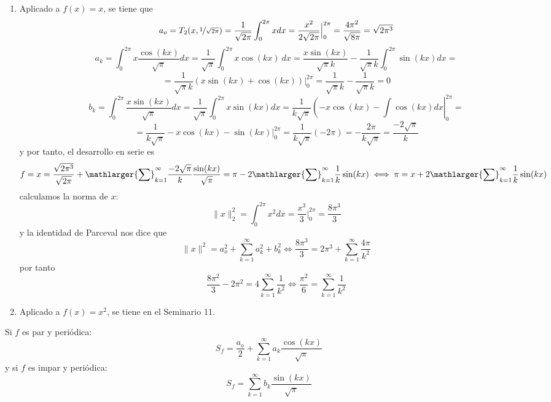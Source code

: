     \begin{eje} \: 
        \begin{enumerate} 
            \item Aplicado a $f(x)=x$, se tiene que
            $$a_o=T_2(x,\nicefrac{1}{\sqrt{2\pi}})= \dfrac{1}{\sqrt{2\pi}} \int_0^{2\pi} x dx=\dfrac{x^2}{2\sqrt{2\pi}} \Big|_0^{2\pi}=\dfrac{4 \pi^2}{\sqrt{8\pi}}=\sqrt{2\pi^3}$$
            $$a_k=\int_0^{2 \pi} x \dfrac{\cos(kx)}{\sqrt{\pi}} dx = \dfrac{1}{\sqrt{\pi}}\int_0^{2 \pi} x \cos(kx) \: dx = \dfrac{x \sin(kx)}{\sqrt{\pi}k}-\dfrac{1}{\sqrt{\pi}k} \int_0^{2\pi} \sin(kx) dx=$$
            $$=\dfrac{1}{\sqrt{\pi}k}\left( x \sin(kx) + \cos(kx)\right) \Big|_{0}^{2\pi} =\dfrac{1}{\sqrt{\pi}k}-\dfrac{1}{\sqrt{\pi}k}=0$$
            $$b_k=\int_0^{2 \pi}  \dfrac{x \sin(kx)}{\sqrt{\pi}} dx = \dfrac{1}{\sqrt{\pi}} \int_0^{2 \pi}  x \sin(kx) dx = \dfrac{1}{k \sqrt{\pi}} \left( -x\cos(kx)-\int \cos(kx) dx\right|_0^{2\pi}=$$
            $$=\dfrac{1}{k \sqrt{\pi}} -x\cos(kx)-\sin(kx) \Big|_0^{2\pi}=\dfrac{1}{k \sqrt{\pi}}(-2\pi)=-\dfrac{2\pi}{k \sqrt{\pi}}=\dfrac{-2\sqrt{\pi}}{k}$$
            y por tanto, el desarrollo en serie es 
            $$f=x=\dfrac{\sqrt{2\pi^3}}{\sqrt{2\pi}} + \mathlarger{\sum}_{k=1}^{\infty} \dfrac{-2\sqrt{\pi}}{k} \dfrac{\sin(kx)}{\sqrt{\pi}}=\pi-2\mathlarger{\sum}_{k=1}^{\infty} \dfrac{1}{k} \sin(kx) \iff \pi=x+2\mathlarger{\sum}_{k=1}^{\infty} \dfrac{1}{k} \sin(kx) $$
            calculamos la norma de $x$:
            $$\|x\|_2^2 =  \int_0^{2\pi} x^2dx=\dfrac{x^3}{3} \Big|_0^{2\pi} =\dfrac{8\pi^3}{3}$$
            y la identidad de Parceval nos dice que
            $$\|x\|^2=a_o^2+\sum_{k=1}^{\infty} a_k^2+b_k^2 \iff \dfrac{8\pi^3}{3}= 2\pi^3 + \sum_{k=1}^{\infty} \dfrac{4\pi}{k^2}$$
            por tanto
            $$\dfrac{8\pi^2}{3}- 2\pi^2 = 4\sum_{k=1}^{\infty} \dfrac{1}{k^2} \iff \boxed{\dfrac{\pi^2}{6}=\sum_{k=1}^{\infty} \dfrac{1}{k^2}} $$
            
            \item Aplicado a $f(x)=x^2$, se tiene en el Seminario 11.            
        \end{enumerate}
        
    \end{eje}
    \begin{obs}
        Si $f$ es par y periódica:
        $$S_f=\dfrac{a_o}{2}+\sum_{k=1}^{\infty} a_k \dfrac{\cos(kx)}{\sqrt{\pi}}$$
        y si $f$ es impar y periódica:
        $$S_f=\sum_{k=1}^{\infty} b_k \dfrac{\sin(kx)}{\sqrt{\pi}}$$
    \end{obs}
